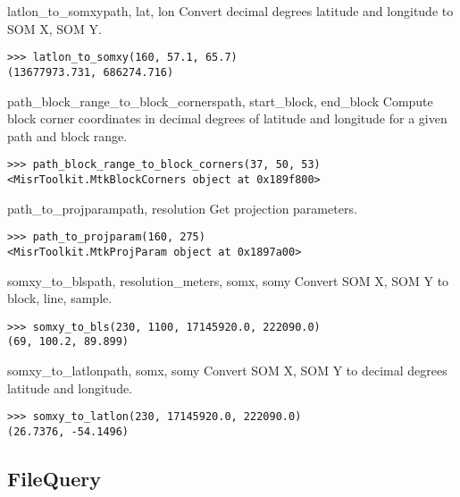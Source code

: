 \documentclass{howto}
\begin{document}
\begin{funcdesc}{latlon_to_somxy}{path, lat, lon}
  Convert decimal degrees latitude and longitude to SOM X, SOM Y.

\begin{verbatim}
>>> latlon_to_somxy(160, 57.1, 65.7)
(13677973.731, 686274.716)
\end{verbatim}
\end{funcdesc}

\begin{funcdesc}{path_block_range_to_block_corners}{path, start_block, end_block}
  Compute block corner coordinates in decimal degrees of latitude and longitude for a given path and block range.

\begin{verbatim}
>>> path_block_range_to_block_corners(37, 50, 53)
<MisrToolkit.MtkBlockCorners object at 0x189f800>
\end{verbatim}
\end{funcdesc}

\begin{funcdesc}{path_to_projparam}{path, resolution}
  Get projection parameters.

\begin{verbatim}
>>> path_to_projparam(160, 275)
<MisrToolkit.MtkProjParam object at 0x1897a00>
\end{verbatim}
\end{funcdesc}

\begin{funcdesc}{somxy_to_bls}{path, resolution_meters, somx, somy}
  Convert SOM X, SOM Y to block, line, sample.

\begin{verbatim}
>>> somxy_to_bls(230, 1100, 17145920.0, 222090.0)
(69, 100.2, 89.899)
\end{verbatim}
\end{funcdesc}

\begin{funcdesc}{somxy_to_latlon}{path, somx, somy}
  Convert SOM X, SOM Y to decimal degrees latitude and longitude.

\begin{verbatim}
>>> somxy_to_latlon(230, 17145920.0, 222090.0)
(26.7376, -54.1496)
\end{verbatim}
\end{funcdesc}


\subsection{FileQuery \label{filequery}}
\end{document}
